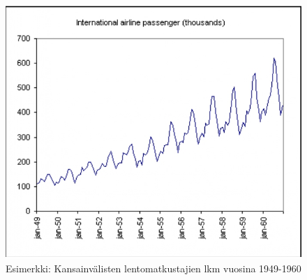 \documentclass[
]{book}
\begin{document}
\begin{figure}

{\centering \includegraphics[width=1\linewidth]{images/time} 

}

\caption{Esimerkki: Kansainvälisten lentomatkustajien lkm vuosina 1949-1960}\label{fig:time}
\end{figure}

\hfill\break

\FloatBarrier
\end{document}
